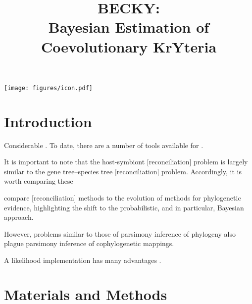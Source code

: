 \documentclass[12pt,letterpaper]{article}
\title{BECKY:\\Bayesian Estimation of Coevolutionary KrYteria}
\begin{document}
\begin{titlepage}
\null
\vfil
\let\newpage\relax\maketitle
\vfil
\centering
\texttt{[image: figures/icon.pdf]}
\vfil
\end{titlepage}

\newpage

\doublespacing

\section*{Introduction}

Considerable . To date, there are a number of tools available for .

It is important to note that the host-symbiont [reconciliation] problem is largely similar to the gene tree--species tree [reconciliation] problem. Accordingly, it is worth comparing these 

\textcite{Akerborg:2009} compare [reconciliation] methods to the evolution of methods for phylogenetic evidence, highlighting the shift to the probabilistic, and in particular, Bayesian approach.

However, problems similar to those of parsimony inference of phylogeny also plague parsimony inference of cophylogenetic mappings.

A likelihood implementation has many advantages \parencite{Charleston:2009}.

\section*{Materials and Methods}
\end{document}
